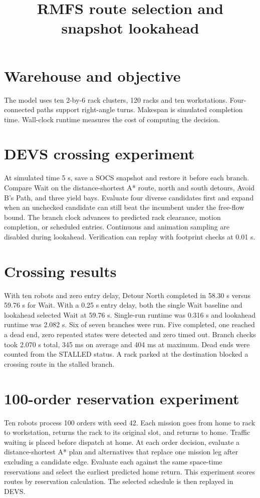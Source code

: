 \documentclass[11pt]{article}
\title{RMFS route selection and snapshot lookahead}
\date{}
\begin{document}
\maketitle

\section{Warehouse and objective}
The model uses ten 2-by-6 rack clusters, 120 racks and ten workstations. Four-connected paths support right-angle turns. Makespan is simulated completion time. Wall-clock runtime measures the cost of computing the decision.

\section{DEVS crossing experiment}
At simulated time 5 s, save a SOCS snapshot and restore it before each branch. Compare Wait on the distance-shortest A* route, north and south detours, Avoid B's Path, and three yield bays. Evaluate four diverse candidates first and expand when an unchecked candidate can still beat the incumbent under the free-flow bound. The branch clock advances to predicted rack clearance, motion completion, or scheduled entries. Continuous and animation sampling are disabled during lookahead. Verification can replay with footprint checks at 0.01 s.

\section{Crossing results}
With ten robots and zero entry delay, Detour North completed in 58.30 s versus 59.76 s for Wait. With a 0.25 s entry delay, both the single Wait baseline and lookahead selected Wait at 59.76 s. Single-run runtime was 0.316 s and lookahead runtime was 2.082 s. Six of seven branches were run. Five completed, one reached a dead end, zero repeated states were detected and zero timed out. Branch checks took 2.070 s total, 345 ms on average and 404 ms at maximum. Dead ends were counted from the STALLED status. A rack parked at the destination blocked a crossing route in the stalled branch.

\section{100-order reservation experiment}
Ten robots process 100 orders with seed 42. Each mission goes from home to rack to workstation, returns the rack to its original slot, and returns to home. Traffic waiting is placed before dispatch at home. At each order decision, evaluate a distance-shortest A* plan and alternatives that replace one mission leg after excluding a candidate edge. Evaluate each against the same space-time reservations and select the earliest predicted home return. This experiment scores routes by reservation calculation. The selected schedule is then replayed in DEVS.
\end{document}
